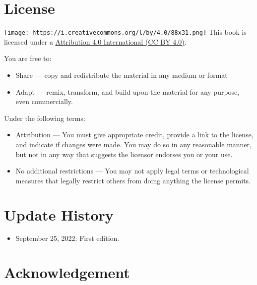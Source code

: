 \documentclass[
  letterpaper,
  DIV=11,
  numbers=noendperiod,
  oneside]{scrreprt}
\providecommand{\tightlist}{%
  \setlength{\itemsep}{0pt}\setlength{\parskip}{0pt}}\usepackage{longtable,booktabs,array}
\begin{document}
\hypertarget{license}{%
\section*{License}\label{license}}

\texttt{[image: https://i.creativecommons.org/l/by/4.0/88x31.png]} This
book is licensed under a
\href{https://creativecommons.org/licenses/by/4.0/}{Attribution 4.0
International (CC BY 4.0)}.

You are free to:

\begin{itemize}
\tightlist
\item
  Share --- copy and redistribute the material in any medium or format
\item
  Adapt --- remix, transform, and build upon the material for any
  purpose, even commercially.
\end{itemize}

Under the following terms:

\begin{itemize}
\tightlist
\item
  Attribution --- You must give appropriate credit, provide a link to
  the license, and indicate if changes were made. You may do so in any
  reasonable manner, but not in any way that suggests the licensor
  endorses you or your use.
\item
  No additional restrictions --- You may not apply legal terms or
  technological measures that legally restrict others from doing
  anything the license permits.
\end{itemize}

\hypertarget{update-history}{%
\section*{Update History}\label{update-history}}

\begin{itemize}
\tightlist
\item
  September 25, 2022: First edition.
\end{itemize}

\hypertarget{acknowledgement}{%
\section*{Acknowledgement}\label{acknowledgement}}
\end{document}
